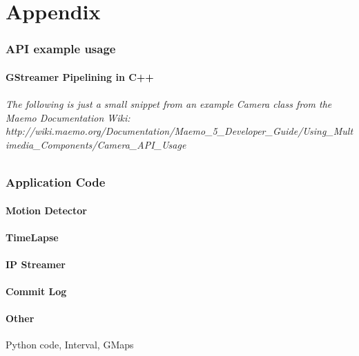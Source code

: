 \documentclass[11pt]{article} %
\begin{document}
\part{Appendix}
\section{API example usage}
\subsection{GStreamer Pipelining in C++}
\paragraph{ The following is just a small snippet from an example Camera class from the Maemo Documentation Wiki:
http://wiki.maemo.org/Documentation/Maemo\_5\_Developer\_Guide/Using\_Multimedia\_Components/Camera\_API\_Usage}

\section{Application Code}
\subsection{Motion Detector}
\subsection{TimeLapse}
\subsection{IP Streamer}
\subsection{Commit Log}
\subsection{Other}{Python code, Interval, GMaps}
\end{document}
